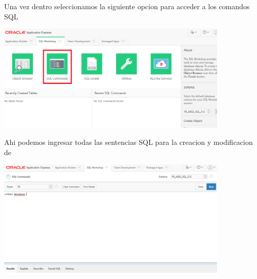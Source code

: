 \documentclass[a4paper,openright,12pt]{book}
\begin{document}
Una vez dentro seleccionamos la siguiente opcion para acceder a los comandos SQL\\
\begin{center}
\includegraphics[width=11cm]{./images/6-1 Ejercicio/3.png}\\
\end{center}

Ahi podemos ingresar todas las sentencias SQL para la creacion y modificacion de\\
\begin{center}
\includegraphics[width=11cm]{./images/6-1 Ejercicio/4.png}\\
\end{center}
\end{document}
